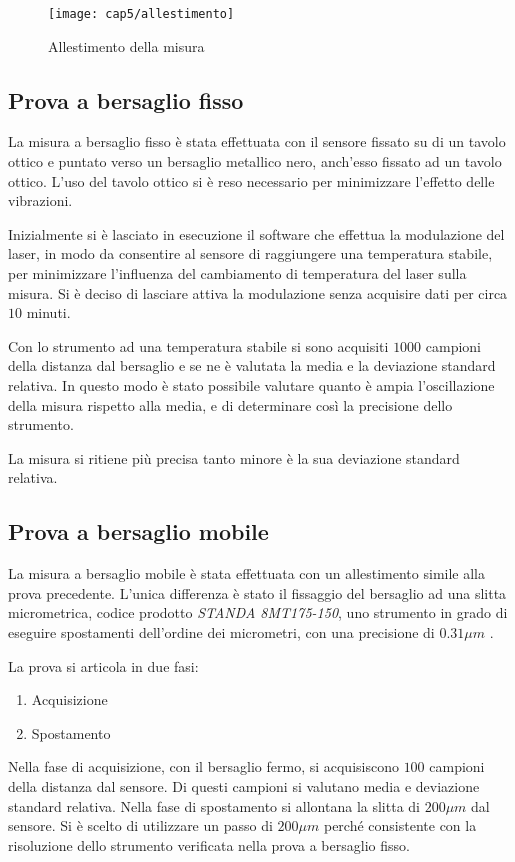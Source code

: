 \begin{figure}
  \begin{center}
    \texttt{[image: cap5/allestimento]}
    \caption{Allestimento della misura}
  \end{center}
\end{figure}

\subsection{Prova a bersaglio fisso}
La misura a bersaglio fisso è stata effettuata con il sensore fissato su di un tavolo ottico e puntato verso un bersaglio metallico nero, anch'esso fissato ad un tavolo ottico. L'uso del tavolo ottico si è reso necessario per minimizzare l'effetto delle vibrazioni.

Inizialmente si è lasciato in esecuzione il software che effettua la modulazione del laser, in modo da consentire al sensore di raggiungere una temperatura stabile, per minimizzare l'influenza del cambiamento di temperatura del laser sulla misura. Si è deciso di lasciare attiva la modulazione senza acquisire dati per circa $10$ minuti.

Con lo strumento ad una temperatura stabile si sono acquisiti $1000$ campioni della distanza dal bersaglio e se ne è valutata la media e la deviazione standard relativa. In questo modo è stato possibile valutare quanto è ampia l'oscillazione della misura rispetto alla media, e di determinare così la precisione dello strumento.

La misura si ritiene più precisa tanto minore è la sua deviazione standard relativa.

\subsection{Prova a bersaglio mobile}
La misura a bersaglio mobile è stata effettuata con un allestimento simile alla prova precedente. L'unica differenza è stato il fissaggio del bersaglio ad una slitta micrometrica, codice prodotto \textit{STANDA 8MT175-150}, uno strumento in grado di eseguire spostamenti dell'ordine dei micrometri, con una precisione di $0.31 \mu m$ \cite{standa}.

La prova si articola in due fasi:
\begin{enumerate}
	\item Acquisizione
	\item Spostamento
\end{enumerate}
Nella fase di acquisizione, con il bersaglio fermo, si acquisiscono $100$ campioni della distanza dal sensore. Di questi campioni si valutano media e deviazione standard relativa.
Nella fase di spostamento si allontana la slitta di $200 \mu m$ dal sensore. Si è scelto di utilizzare un passo di $200 \mu m$ perché consistente con la risoluzione dello strumento verificata nella prova a bersaglio fisso.

